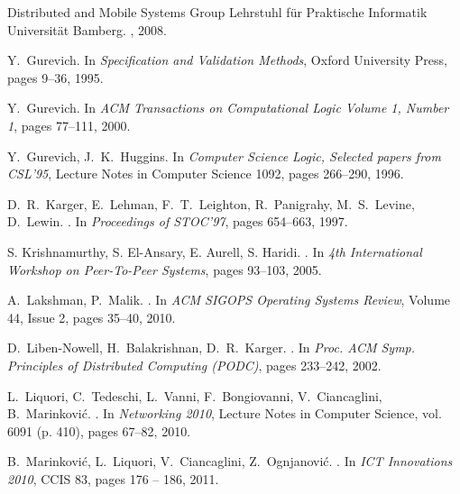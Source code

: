 \documentclass{amsart}
\theoremstyle{definition}
\begin{document}
\begin{thebibliography}{}
\newblock Distributed and Mobile Systems Group Lehrstuhl f\"ur Praktische Informatik Universit\"at Bamberg.
, 2008.

 Y.~Gurevich.
\newblock In {\em Specification and Validation Methods}, Oxford University Press, pages 9--36, 1995.

 Y.~Gurevich.
\newblock In {\em ACM Transactions on Computational Logic Volume 1, Number 1}, pages 77--111, 2000.

 Y.~Gurevich, J.~K.~Huggins.
\newblock In {\em Computer Science Logic, Selected papers from CSL'95}, Lecture Notes in Computer Science 1092, pages 266--290, 1996.

 D.~R.~Karger, E.~Lehman, F.~T.~Leighton, R.~Panigrahy, M.~S.~Levine, D.~Lewin.
.
\newblock In {\em Proceedings of STOC'97}, pages 654--663, 1997.

S. Krishnamurthy, S. El-Ansary, E. Aurell, S. Haridi.
.
\newblock In {\em 4th International Workshop on Peer-To-Peer Systems}, pages 93--103, 2005.

A.~Lakshman, P.~Malik.
.
\newblock In {\em ACM SIGOPS Operating Systems Review}, Volume 44, Issue 2, pages 35--40, 2010.

D.~Liben-Nowell, H.~Balakrishnan, D.~R.~Karger.
.
\newblock In {\em Proc.  ACM Symp. Principles of Distributed Computing (PODC)}, pages 233--242, 2002.



L.~Liquori, C.~Tedeschi, L.~Vanni, F.~Bongiovanni, V.~Ciancaglini, B.~Marinkovi\'{c}.
.
\newblock In {\em Networking 2010}, Lecture Notes in Computer Science, vol. 6091 (p. 410), pages 67--82, 2010.

B.~Marinkovi\'c, L.~Liquori, V.~Ciancaglini, Z.~Ognjanovi\'c.
.
\newblock In {\em ICT Innovations 2010}, CCIS 83, pages 176 -- 186, 2011.


\end{thebibliography}
\end{document}
